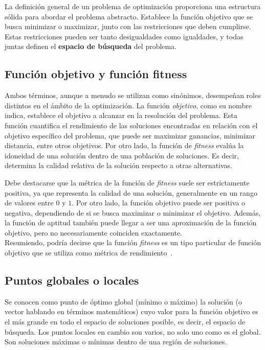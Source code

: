 La definición general de un problema de optimización proporciona una estructura sólida para abordar el problema abstracto. Establece la función objetivo que se busca minimizar o maximizar, junto con las restricciones que deben cumplirse. Estas restricciones pueden ser tanto desigualdades como igualdades, y todas juntas definen el \textbf{espacio de búsqueda} del problema.

\subsection{Función objetivo y función fitness}
Ambos términos, aunque a menudo se utilizan como sinónimos, desempeñan roles distintos en el ámbito de la optimización. La función \textit{objetivo}, como su nombre indica, establece el objetivo a alcanzar en la resolución del problema. Esta función cuantifica el rendimiento de las soluciones encontradas en relación con el objetivo específico del problema, que puede ser maximizar ganancias, minimizar distancia, entre otros objetivos. Por otro lado, la función de \textit{fitness}  evalúa la idoneidad de una solución dentro de una población de soluciones. Es decir, determina la calidad relativa de la solución respecto a otras alternativas.

Debe destacarse que la métrica de la función de \textit{fitness} suele ser estrictamente positiva, ya que representa la calidad de una solución, generalmente en un rango de valores entre $0$ y $1$. Por otro lado, la función objetivo puede ser positiva o negativa, dependiendo de si se busca maximizar o minimizar el objetivo. Además, la función de aptitud también puede llegar a ser una aproximación de la función objetivo, pero no necesariamente coinciden exactamente.\\[6pt]
Resumiendo, podría decirse que la función \textit{fitness} es un tipo particular de función objetivo que se utiliza como métrica de rendimiento~\cite{eiben2015}.

\subsection{Puntos globales o locales}
Se conocen como punto de óptimo global (mínimo o máximo) la solución (o vector hablando en términos matemáticos) cuyo valor para la función objetivo es el más grande en todo el espacio de soluciones posible, es decir, el espacio de búsqueda. Los puntos locales en cambio son varios, no solo uno como es el global. Son soluciones máximas o mínimas dentro de una región de soluciones.

